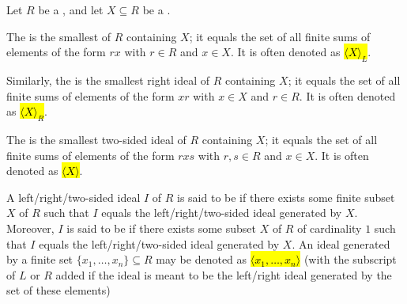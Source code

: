 \begin{definition} \label{definition:ideal_generated_by_a_subset_of_a_ring}
    Let $R$ be a , and let $X \subseteq R$ be a .

    The  is the smallest  of $R$ containing $X$; it equals the set of all finite sums of elements of the form $r x$ with $r \in R$ and $x \in X$. It is often denoted as \hl{$\langle X \rangle_L$}.

    Similarly, the  is the smallest right ideal of $R$ containing $X$; it equals the set of all finite sums of elements of the form $x r$ with $x \in X$ and $r \in R$. It is often denoted as \hl{$\langle X \rangle_R$}.


    The  is the smallest two-sided ideal of $R$ containing $X$; it equals the set of all finite sums of elements of the form $r x s$ with $r, s \in R$ and $x \in X$. It is often denoted as \hl{$\langle X \rangle$}.

    A left/right/two-sided ideal $I$ of $R$ is said to be  if there exists some finite subset $X$ of $R$ such that $I$ equals the left/right/two-sided ideal generated by $X$. Moreover, $I$ is said to be  if there exists some subset $X$ of $R$ of cardinality $1$ such that $I$ equals the left/right/two-sided ideal generated by $X$. An ideal generated by a finite set $\{x_1,\ldots,x_n\} \subseteq R$ may be denoted as \hl{$\langle x_1,\ldots, x_n \rangle$} (with the subscript of $L$ or $R$ added if the ideal is meant to be the left/right ideal generated by the set of these elements)

\end{definition}
